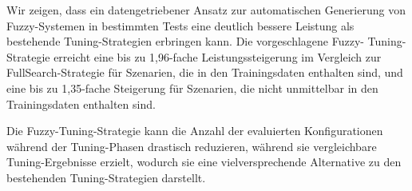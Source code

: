 Wir zeigen, dass ein datengetriebener Ansatz zur automatischen Generierung von Fuzzy-Systemen in bestimmten Tests eine deutlich bessere Leistung als bestehende Tuning-Strategien erbringen kann. Die vorgeschlagene Fuzzy- Tuning-Strategie erreicht eine bis zu 1,96-fache Leistungssteigerung im Vergleich zur FullSearch-Strategie für Szenarien, die in den Trainingsdaten enthalten sind, und eine bis zu 1,35-fache Steigerung für Szenarien, die nicht unmittelbar in den Trainingsdaten enthalten sind.

Die Fuzzy-Tuning-Strategie kann die Anzahl der evaluierten Konfigurationen während der Tuning-Phasen drastisch reduzieren, während sie vergleichbare Tuning-Ergebnisse erzielt, wodurch sie eine vielversprechende Alternative zu den bestehenden Tuning-Strategien darstellt.


\cleardoublepage